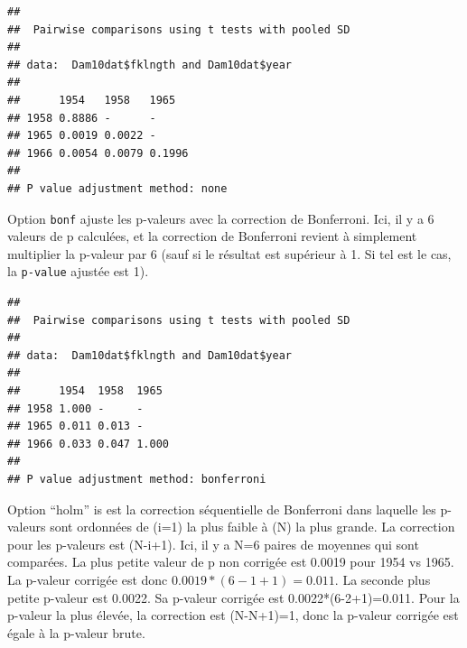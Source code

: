 \documentclass[12pt,]{book}
\newenvironment{Shaded}{\begin{snugshade}}{\end{snugshade}}
\newcommand{\DataTypeTok}[1]{\textcolor[rgb]{0.13,0.29,0.53}{#1}}
\newcommand{\KeywordTok}[1]{\textcolor[rgb]{0.13,0.29,0.53}{\textbf{#1}}}
\newcommand{\NormalTok}[1]{#1}
\newcommand{\OperatorTok}[1]{\textcolor[rgb]{0.81,0.36,0.00}{\textbf{#1}}}
\newcommand{\StringTok}[1]{\textcolor[rgb]{0.31,0.60,0.02}{#1}}
\begin{document}
\begin{Shaded}
\end{Shaded}

\begin{verbatim}
## 
##  Pairwise comparisons using t tests with pooled SD 
## 
## data:  Dam10dat$fklngth and Dam10dat$year 
## 
##      1954   1958   1965  
## 1958 0.8886 -      -     
## 1965 0.0019 0.0022 -     
## 1966 0.0054 0.0079 0.1996
## 
## P value adjustment method: none
\end{verbatim}

Option \texttt{bonf} ajuste les p-valeurs avec la correction de Bonferroni. Ici, il y a 6 valeurs de p calculées, et la correction de Bonferroni revient à simplement multiplier la p-valeur par 6 (sauf si le résultat est supérieur à 1. Si tel est le cas, la \texttt{p-value} ajustée est 1).

\begin{Shaded}
\end{Shaded}

\begin{verbatim}
## 
##  Pairwise comparisons using t tests with pooled SD 
## 
## data:  Dam10dat$fklngth and Dam10dat$year 
## 
##      1954  1958  1965 
## 1958 1.000 -     -    
## 1965 0.011 0.013 -    
## 1966 0.033 0.047 1.000
## 
## P value adjustment method: bonferroni
\end{verbatim}

Option ``holm'' is est la correction séquentielle de Bonferroni dans laquelle les p-valeurs sont ordonnées de (i=1) la plus faible à (N) la plus grande. La correction pour les p-valeurs est (N-i+1). Ici, il y a N=6 paires de moyennes qui sont comparées. La plus petite valeur de p non corrigée est 0.0019 pour 1954 vs 1965. La p-valeur corrigée est donc \(0.0019*(6-1+1)=0.011\). La seconde plus petite p-valeur est 0.0022. Sa p-valeur corrigée est 0.0022*(6-2+1)=0.011. Pour la p-valeur la plus élevée, la correction est (N-N+1)=1, donc la p-valeur corrigée est égale à la p-valeur brute.
\end{document}
